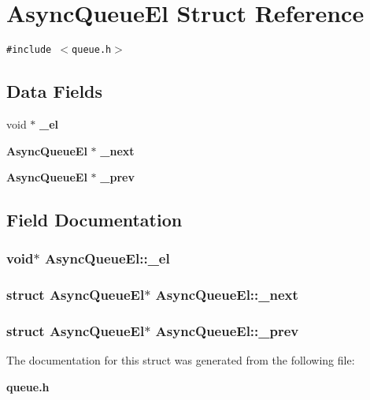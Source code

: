 \section{Async\-Queue\-El Struct Reference}
\label{structAsyncQueueEl}
{\tt \#include $<$queue.h$>$}

\subsection*{Data Fields}
\begin{CompactItemize}
\item 
void $\ast$ {\bf \_\-el}
\item 
{\bf Async\-Queue\-El} $\ast$ {\bf \_\-next}
\item 
{\bf Async\-Queue\-El} $\ast$ {\bf \_\-prev}
\end{CompactItemize}


\subsection{Field Documentation}
\subsubsection{\setlength{\rightskip}{0pt plus 5cm}void$\ast$ {\bf Async\-Queue\-El::\_\-el}}\label{structAsyncQueueEl_o0}


\subsubsection{\setlength{\rightskip}{0pt plus 5cm}struct {\bf Async\-Queue\-El}$\ast$ {\bf Async\-Queue\-El::\_\-next}}\label{structAsyncQueueEl_o1}


\subsubsection{\setlength{\rightskip}{0pt plus 5cm}struct {\bf Async\-Queue\-El}$\ast$ {\bf Async\-Queue\-El::\_\-prev}}\label{structAsyncQueueEl_o2}




The documentation for this struct was generated from the following file:\begin{CompactItemize}
\item 
{\bf queue.h}\end{CompactItemize}

